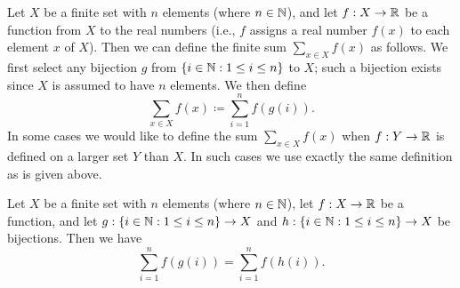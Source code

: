 \begin{defn}\label{7.1.6}
  Let \(X\) be a finite set with \(n\) elements (where \(n \in \mathbb{N}\)), and let \(f : X \to \mathbb{R}\) be a function from \(X\) to the real numbers
  (i.e., \(f\) assigns a real number \(f(x)\) to each element \(x\) of \(X\)).
  Then we can define the finite sum \(\sum_{x \in X} f(x)\) as follows.
  We first select any bijection \(g\) from \(\left\lbrace i \in \mathbb{N} : 1 \leq i \leq n\right\rbrace\) to \(X\);
  such a bijection exists since \(X\) is assumed to have \(n\) elements.
  We then define
  \[
    \sum_{x \in X} f(x) \coloneqq \sum_{i = 1}^n f(g(i)).
  \]
  In some cases we would like to define the sum \(\sum_{x \in X} f(x)\) when \(f : Y \to \mathbb{R}\) is defined on a larger set \(Y\) than \(X\).
  In such cases we use exactly the same definition as is given above.
\end{defn}

\setcounter{thm}{7}
\begin{prop}\label{7.1.8}
  Let \(X\) be a finite set with \(n\) elements (where \(n \in \mathbb{N}\)), let \(f : X \to \mathbb{R}\) be a function, and let \(g : \left\lbrace i \in \mathbb{N} : 1 \leq i \leq n\right\rbrace \to X\) and \(h : \left\lbrace i \in \mathbb{N} : 1 \leq i \leq n\right\rbrace \to X\) be bijections.
  Then we have
  \[
    \sum_{i = 1}^n f(g(i)) = \sum_{i = 1}^n f(h(i)).
  \]
\end{prop}

